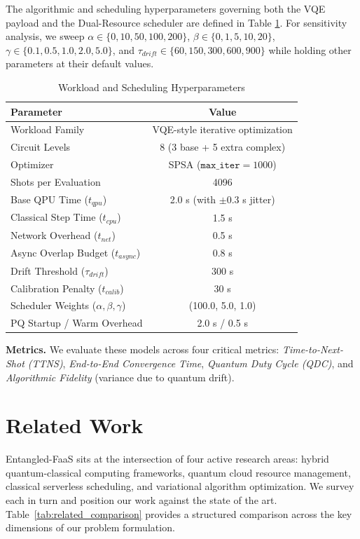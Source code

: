 \documentclass[conference]{IEEEtran}
\begin{document}
The algorithmic and scheduling hyperparameters governing both the VQE payload and the Dual-Resource scheduler are defined in Table \ref{tab:hyperparams}.
For sensitivity analysis, we sweep $\alpha\in\{0,10,50,100,200\}$, $\beta\in\{0,1,5,10,20\}$, $\gamma\in\{0.1,0.5,1.0,2.0,5.0\}$, and $\tau_{drift}\in\{60,150,300,600,900\}$ while holding other parameters at their default values.

\begin{table}[htbp]
\caption{Workload and Scheduling Hyperparameters}
\label{tab:hyperparams}
\centering
\begin{tabular}{lc}
\hline
\textbf{Parameter} & \textbf{Value} \\ \hline
Workload Family & VQE-style iterative optimization \\
Circuit Levels & 8 (3 base + 5 extra complex) \\
Optimizer & SPSA ($\texttt{max\_iter}=1000$) \\
Shots per Evaluation & 4096 \\
Base QPU Time ($t_{qpu}$) & 2.0 s (with $\pm0.3$ s jitter) \\
Classical Step Time ($t_{cpu}$) & 1.5 s \\
Network Overhead ($t_{net}$) & 0.5 s \\
Async Overlap Budget ($t_{async}$) & 0.8 s \\
Drift Threshold ($\tau_{drift}$) & 300 s \\
Calibration Penalty ($t_{calib}$) & 30 s \\
Scheduler Weights ($\alpha,\beta,\gamma$) & (100.0, 5.0, 1.0) \\
PQ Startup / Warm Overhead & 2.0 s / 0.5 s \\ \hline
\end{tabular}
\end{table}

\textbf{Metrics.} We evaluate these models across four critical metrics: \textit{Time-to-Next-Shot (TTNS)}, \textit{End-to-End Convergence Time}, \textit{Quantum Duty Cycle (QDC)}, and \textit{Algorithmic Fidelity} (variance due to quantum drift).


\section{Related Work}
\label{sec:related}

Entangled-FaaS sits at the intersection of four active research areas:
hybrid quantum-classical computing frameworks, quantum cloud resource
management, classical serverless scheduling, and variational algorithm
optimization. We survey each in turn and position our work against the
state of the art. Table~\ref{tab:related_comparison} provides a
structured comparison across the key dimensions of our problem
formulation.
\end{document}
